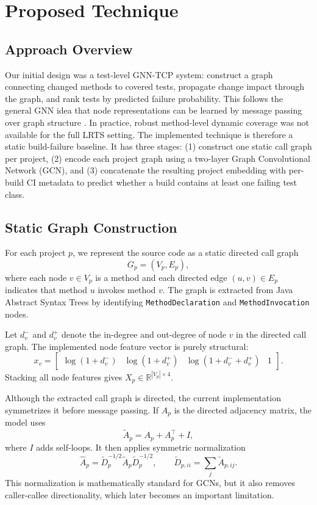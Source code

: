 \section{Proposed Technique}

\subsection{Approach Overview}
Our initial design was a test-level GNN-TCP system: construct a graph connecting changed methods to covered tests, propagate change impact through the graph, and rank tests by predicted failure probability. This follows the general GNN idea that node representations can be learned by message passing over graph structure \cite{zhou2021gnnreview}. In practice, robust method-level dynamic coverage was not available for the full LRTS setting. The implemented technique is therefore a static build-failure baseline. It has three stages: (1) construct one static call graph per project, (2) encode each project graph using a two-layer Graph Convolutional Network (GCN), and (3) concatenate the resulting project embedding with per-build CI metadata to predict whether a build contains at least one failing test class.

\subsection{Static Graph Construction}

For each project $p$, we represent the source code as a static directed call graph
\[
G_p=(V_p,E_p),
\]
where each node $v\in V_p$ is a method and each directed edge $(u,v)\in E_p$ indicates that method $u$ invokes method $v$. The graph is extracted from Java Abstract Syntax Trees by identifying \texttt{MethodDeclaration} and \texttt{MethodInvocation} nodes.

Let $d^-_v$ and $d^+_v$ denote the in-degree and out-degree of node $v$ in the directed call graph. The implemented node feature vector is purely structural:
\[
x_v =
\begin{bmatrix}
\log(1+d^-_v) &
\log(1+d^+_v) &
\log(1+d^-_v+d^+_v) &
1
\end{bmatrix}.
\]
Stacking all node features gives $X_p\in\mathbb{R}^{|V_p|\times 4}$.

Although the extracted call graph is directed, the current implementation symmetrizes it before message passing. If $A_p$ is the directed adjacency matrix, the model uses
\[
\tilde{A}_p = A_p + A_p^\top + I,
\]
where $I$ adds self-loops. It then applies symmetric normalization
\[
\hat{A}_p = \tilde{D}_p^{-1/2}\tilde{A}_p\tilde{D}_p^{-1/2},
\qquad
\tilde{D}_{p,ii}=\sum_j \tilde{A}_{p,ij}.
\]
This normalization is mathematically standard for GCNs, but it also removes caller-callee directionality, which later becomes an important limitation.

